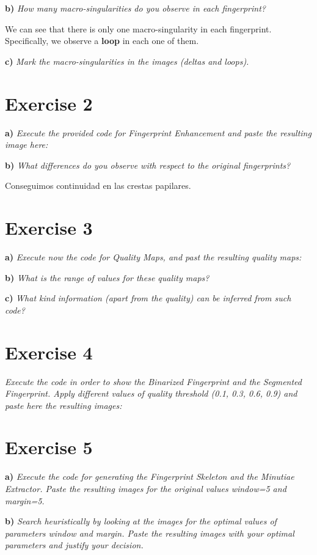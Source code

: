 \documentclass[11pt]{article}
\begin{document}
\textbf{b) } \emph{How many macro-singularities do you observe in each fingerprint?}

We can see that there is only one macro-singularity in each fingerprint. Specifically, we observe a \textbf{loop} in each one of them.

\textbf{c) } \emph{Mark the macro-singularities in the images (deltas and loops).}

\section{Exercise 2}

\textbf{a) }\emph{Execute the provided code for Fingerprint Enhancement and paste the resulting image here:}

\textbf{b) }\emph{What differences do you observe with respect to the original fingerprints?}

Conseguimos continuidad en las crestas papilares.

\section{Exercise 3}

\textbf{a) }\emph{Execute now the code for Quality Maps, and past the resulting quality maps:}

\textbf{b) }\emph{What is the range of values for these quality maps?}

\textbf{c) }\emph{What kind information (apart from the quality) can be inferred from such code?}

\section{Exercise 4}

\emph{Execute the code in order to show the Binarized Fingerprint and the Segmented Fingerprint. Apply different values of quality threshold (0.1, 0.3, 0.6, 0.9) and paste here the resulting images:}

\section{Exercise 5}

\textbf{a) }\emph{Execute the code for generating the Fingerprint Skeleton and the Minutiae Extractor. Paste the resulting images for the original values window=5 and margin=5.}

\textbf{b) }\emph{Search heuristically by looking at the images for the optimal values of parameters window and margin. Paste the resulting images with your optimal parameters and justify your decision.}
\end{document}
